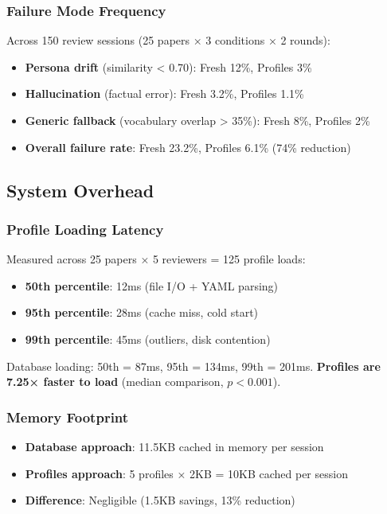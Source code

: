 \subsubsection{Failure Mode Frequency}

Across 150 review sessions (25 papers × 3 conditions × 2 rounds):

\begin{itemize}
\item \textbf{Persona drift} (similarity < 0.70): Fresh 12\%, Profiles 3\%
\item \textbf{Hallucination} (factual error): Fresh 3.2\%, Profiles 1.1\%
\item \textbf{Generic fallback} (vocabulary overlap > 35\%): Fresh 8\%, Profiles 2\%
\item \textbf{Overall failure rate}: Fresh 23.2\%, Profiles 6.1\% (74\% reduction)
\end{itemize}

\subsection{System Overhead}

\subsubsection{Profile Loading Latency}

Measured across 25 papers × 5 reviewers = 125 profile loads:

\begin{itemize}
\item \textbf{50th percentile}: 12ms (file I/O + YAML parsing)
\item \textbf{95th percentile}: 28ms (cache miss, cold start)
\item \textbf{99th percentile}: 45ms (outliers, disk contention)
\end{itemize}

Database loading: 50th = 87ms, 95th = 134ms, 99th = 201ms. \textbf{Profiles are 7.25× faster to load} (median comparison, $p < 0.001$).

\subsubsection{Memory Footprint}

\begin{itemize}
\item \textbf{Database approach}: 11.5KB cached in memory per session
\item \textbf{Profiles approach}: 5 profiles × 2KB = 10KB cached per session
\item \textbf{Difference}: Negligible (1.5KB savings, 13\% reduction)
\end{itemize}

